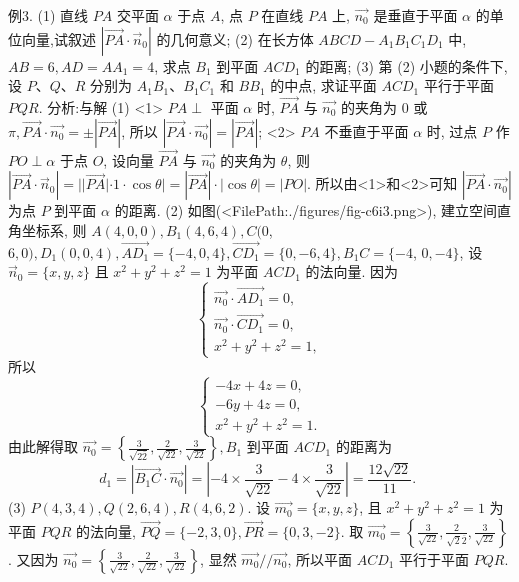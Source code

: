 例3. (1) 直线 $P A$ 交平面 $\alpha$ 于点 $A$, 点 $P$ 在直线 $P A$ 上, $\overrightarrow{n_0}$ 是垂直于平面 $\alpha$ 的单位向量,试叙述 $\left|\overrightarrow{P A} \cdot \vec{n}_0\right|$ 的几何意义;
(2) 在长方体 $A B C D-A_1 B_1 C_1 D_1$ 中, $A B=6, A D=A A_1=4$, 求点 $B_1$ 到平面 $A C D_1$ 的距离;
(3) 第 (2) 小题的条件下, 设 $P 、 Q 、 R$ 分别为 $A_1 B_1 、 B_1 C_1$ 和 $B B_1$ 的中点, 求证平面 $A C D_1$ 平行于平面 $P Q R$.
分析:与解 (1) <1> $P A \perp$ 平面 $\alpha$ 时, $\overrightarrow{P A}$ 与 $\overrightarrow{n_0}$ 的夹角为 0 或 $\pi, \overrightarrow{P A} \cdot \overrightarrow{n_0}=\pm|\overrightarrow{P A}|$, 所以 $\left|\overrightarrow{P A} \cdot \overrightarrow{n_0}\right|=|\overrightarrow{P A}|$;
<2> $P A$ 不垂直于平面 $\alpha$ 时, 过点 $P$ 作 $P O \perp \alpha$ 于点 $O$, 设向量 $\overrightarrow{P A}$ 与 $\overrightarrow{n_0}$ 的夹角为 $\theta$, 则 $\left|\overrightarrow{P A} \cdot \vec{n}_0\right|=|| \overrightarrow{P A}|\cdot 1 \cdot \cos \theta|=|\overrightarrow{P A}| \cdot|\cos \theta|=|P O|$.
所以由<1>和<2>可知 $\left|\overrightarrow{P A} \cdot \overrightarrow{n_0}\right|$ 为点 $P$ 到平面 $\alpha$ 的距离.
(2) 如图(<FilePath:./figures/fig-c6i3.png>), 建立空间直角坐标系, 则 $A(4,0,0), B_1(4,6,4), C(0$, $6,0), D_1(0,0,4), \overrightarrow{A D_1}=\{-4,0,4\}, \overrightarrow{C D_1}=\{0,-6,4\}, B_1 C=\{-4$, $0,-4\}$, 设 $\vec{n}_0=\{x, y, z\}$ 且 $x^2+y^2+z^2=1$ 为平面 $A C D_1$ 的法向量.
因为
$$
\left\{\begin{array}{l}
\overrightarrow{n_0} \cdot \overrightarrow{A D_1}=0, \\
\overrightarrow{n_0} \cdot \overrightarrow{C D_1}=0, \\
x^2+y^2+z^2=1,
\end{array}\right.
$$
所以
$$
\left\{\begin{array}{l}
-4 x+4 z=0, \\
-6 y+4 z=0, \\
x^2+y^2+z^2=1 .
\end{array}\right.
$$
由此解得取 $\overrightarrow{n_0}=\left\{\frac{3}{\sqrt{2 \overline{2}}}, \frac{2}{\sqrt{22}}, \frac{3}{\sqrt{22}}\right\}, B_1$ 到平面 $A C D_1$ 的距离为
$$
d_1=\left|\overrightarrow{B_1 C} \cdot \overrightarrow{n_0}\right|=\left|-4 \times \frac{3}{\sqrt{22}}-4 \times \frac{3}{\sqrt{22}}\right|=\frac{12 \sqrt{22}}{11} \text {. }
$$
(3) $P(4,3,4), Q(2,6,4), R(4,6,2)$.
设 $\overrightarrow{m_0}=\{x, y, z\}$, 且 $x^2+y^2+z^2=1$ 为平面 $P Q R$ 的法向量, $\overrightarrow{P Q}= \{-2,3,0\}, \overrightarrow{P R}=\{0,3,-2\}$.
取 $\overrightarrow{m_0}=\left\{\frac{3}{\sqrt{22}}, \frac{2}{\sqrt{2} \overline{2}}, \frac{3}{\sqrt{22}}\right\}$.
又因为 $\overrightarrow{n_0}=\left\{\frac{3}{\sqrt{22}}, \frac{2}{\sqrt{22}}, \frac{3}{\sqrt{22}}\right\}$, 显然 $\overrightarrow{m_0} / / \overrightarrow{n_0}$, 所以平面 $A C D_1$ 平行于平面 $P Q R$.



